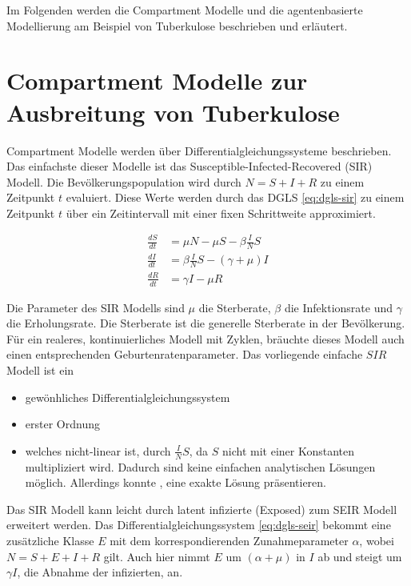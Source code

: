 \documentclass[paper=a4, fontsize=11pt, ngerman, abstract=on]{scrartcl}
\numberwithin{equation}{section} %
\numberwithin{figure}{section} %
\numberwithin{table}{section} %
\begin{document}
Im Folgenden werden die Compartment Modelle und die agentenbasierte Modellierung am Beispiel von Tuberkulose beschrieben und erläutert.

\section{Compartment Modelle zur Ausbreitung von Tuberkulose}

Compartment Modelle werden über Differentialgleichungssysteme beschrieben. Das einfachste dieser Modelle ist das Susceptible-Infected-Recovered (SIR) Modell. Die Bevölkerungspopulation wird durch $N = S + I + R$ zu einem Zeitpunkt $t$ evaluiert. Diese Werte werden durch das DGLS \ref{eq:dgls-sir} zu einem Zeitpunkt $t$ über ein Zeitintervall mit einer fixen Schrittweite approximiert.

\begin{equation}
\begin{split}
  \frac{dS}{dt} &= \mu N - \mu S - \beta \frac{I}{N}S \\
  \frac{dI}{dt} &= \beta \frac{I}{N}S  - (\gamma + \mu)I \\
  \frac{dR}{dt} &= \gamma I - \mu R
\end{split}
\label{eq:dgls-sir}
\end{equation}

Die Parameter des SIR Modells sind $\mu$ die Sterberate, $\beta$ die Infektionsrate und $\gamma$ die Erholungsrate. Die Sterberate ist die generelle Sterberate in der Bevölkerung. Für ein realeres, kontinuierliches Modell mit Zyklen, bräuchte dieses Modell auch einen entsprechenden Geburtenratenparameter. Das vorliegende einfache $SIR$ Modell ist ein

\begin{itemize}
  \item{gewönhliches Differentialgleichungssystem}
  \item{erster Ordnung}
  \item{welches nicht-linear ist, durch $\frac{I}{N}S$, da $S$ nicht mit einer Konstanten multipliziert wird. Dadurch sind keine einfachen analytischen Lösungen möglich. Allerdings konnte \cite{Harko2014}, eine exakte Lösung präsentieren.}
\end{itemize}

 Das SIR Modell kann leicht durch latent infizierte (Exposed) zum SEIR Modell erweitert werden. Das Differentialgleichungssystem \ref{eq:dgls-seir} bekommt eine zusätzliche Klasse $E$ mit dem korrespondierenden Zunahmeparameter $\alpha$, wobei $N = S + E + I + R$ gilt. Auch hier nimmt $E$ um $(\alpha + \mu)$ in $I$ ab und steigt um $\gamma I$, die Abnahme der infizierten, an.
\end{document}
